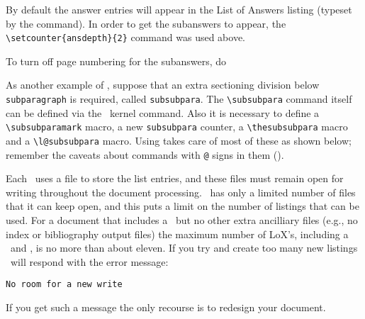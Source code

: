      By default the answer entries will appear in the List of Answers 
listing (typeset by the  command).
In order to get the subanswers to appear, 
the \verb?\setcounter{ansdepth}{2}? command was used above.

 To turn off page numbering for the subanswers, do
\begin{lcode}
\end{lcode}

    As another example of \cmd{\newlistentry}, suppose that an extra 
sectioning division below \texttt{subparagraph} is required, 
called \texttt{subsubpara}. The \verb?\subsubpara? command itself can 
be defined via the \ltx\ kernel \cmd{\@startsection} command. 
Also it is necessary to define a \verb?\subsubparamark? macro,
a new \texttt{subsubpara} counter, a \verb?\thesubsubpara? macro and a 
\verb?\l@subsubpara?  macro. Using \cmd{\newlistentry} takes care of 
most of these as shown below; remember the caveats about commands 
with \idxatincode\texttt{@} signs in them (\seeatincode).
\begin{lcode}
 \newcommand{\subsubpara}{\@startsection{subpara}
    {6}                              %
    {\parindent}                     %
    {3.25ex \@plus1ex \@minus .2ex}  %
    {-1em}       run-in heading with %
    {\normalfont\normalsize\itshape} %
 }
 \newcommand*{\subsubparamark}[1]{}  %
 \end{lcode}

     Each \listofx\ uses a file to store the list entries, and these
 files must remain open for writing throughout the document processing.
\tx\ has only a limited number of files that it can keep open, and this
 puts a limit on the number of listings that can be used. For a document
 that includes a \toc\ but no other extra ancilliary files (e.g., no
 index or bibliography output files) 
the maximum number of LoX's, including a \lof\ and \lot, is no more 
than about eleven. If you try and create too many new listings \ltx\ 
will respond with the error message: 
 \begin{center}
 \texttt{No room for a new write} 
 \end{center}
 If you get such a message the only recourse is to redesign your 
document.

